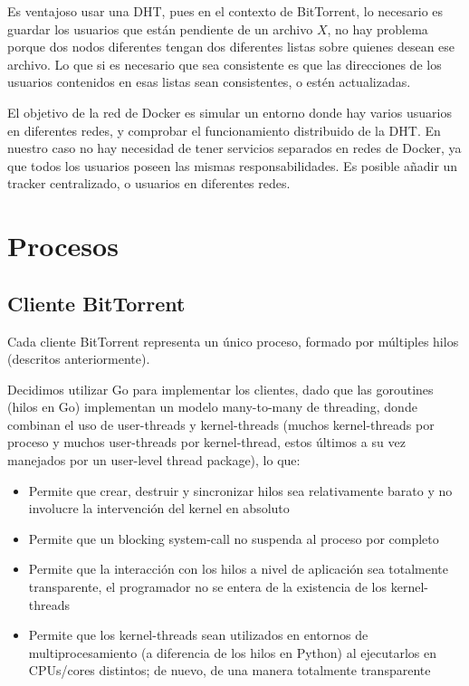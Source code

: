 \documentclass{article}
\begin{document}
Es ventajoso usar una DHT, pues en el contexto de BitTorrent, lo necesario es guardar los usuarios que están pendiente de un archivo $X$, no hay problema porque dos nodos diferentes tengan dos diferentes listas sobre quienes desean ese archivo. Lo que si es necesario que sea consistente es que las direcciones de los usuarios contenidos en esas listas sean consistentes, o estén actualizadas.

El objetivo de la red de Docker es simular un entorno donde hay varios usuarios en diferentes redes, y comprobar el funcionamiento distribuido de la DHT. En nuestro caso no hay necesidad de tener servicios separados en redes de Docker, ya que todos los usuarios poseen las mismas responsabilidades. Es posible añadir un tracker centralizado, o usuarios en diferentes redes.

\section{Procesos}

\subsection{Cliente BitTorrent}

Cada cliente BitTorrent representa un único proceso, formado por múltiples hilos (descritos anteriormente).

Decidimos utilizar Go para implementar los clientes, dado que las goroutines (hilos en Go) implementan un modelo many-to-many de threading, donde combinan el uso de user-threads y kernel-threads (muchos kernel-threads por proceso y muchos user-threads por kernel-thread, estos últimos a su vez manejados por un user-level thread package), lo que:

\begin{itemize}
    \item Permite que crear, destruir y sincronizar hilos sea relativamente barato y no involucre la intervención del kernel en absoluto
    \item Permite que un blocking system-call no suspenda al proceso por completo
    \item Permite que la interacción con los hilos a nivel de aplicación sea totalmente transparente, el programador no se entera de la existencia de los kernel-threads
    \item Permite que los kernel-threads sean utilizados en entornos de multiprocesamiento (a diferencia de los hilos en Python) al ejecutarlos en CPUs/cores distintos; de nuevo, de una manera totalmente transparente
\end{itemize}
\end{document}
